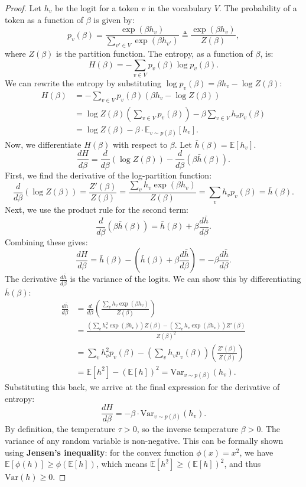 \begin{proof}
Let $h_v$ be the logit for a token $v$ in the vocabulary $V$. The probability of a token as a function of $\beta$ is given by:
\[
p_v(\beta) = \frac{\exp(\beta h_v)}{\sum_{v' \in V} \exp(\beta h_{v'})} \triangleq \frac{\exp(\beta h_v)}{Z(\beta)},
\]
where $Z(\beta)$ is the partition function. The entropy, as a function of $\beta$, is:
\[
H(\beta) = -\sum_{v \in V} p_v(\beta) \log p_v(\beta).
\]
We can rewrite the entropy by substituting $\log p_v(\beta) = \beta h_v - \log Z(\beta)$:
\begin{align*}
H(\beta) &= -\sum_{v \in V} p_v(\beta) (\beta h_v - \log Z(\beta)) \\
&= \log Z(\beta) \left(\sum_{v \in V} p_v(\beta)\right) - \beta \sum_{v \in V} h_v p_v(\beta) \\
&= \log Z(\beta) - \beta \cdot \mathbb{E}_{v \sim p(\beta)}[h_v].
\end{align*}
Now, we differentiate $H(\beta)$ with respect to $\beta$. Let $\bar{h}(\beta) = \mathbb{E}[h_v]$.
\[
\frac{dH}{d\beta} = \frac{d}{d\beta}(\log Z(\beta)) - \frac{d}{d\beta}(\beta \bar{h}(\beta)).
\]
First, we find the derivative of the log-partition function:
\[
\frac{d}{d\beta}(\log Z(\beta)) = \frac{Z'(\beta)}{Z(\beta)} = \frac{\sum_v h_v \exp(\beta h_v)}{Z(\beta)} = \sum_v h_v p_v(\beta) = \bar{h}(\beta).
\]
Next, we use the product rule for the second term:
\[
\frac{d}{d\beta}(\beta \bar{h}(\beta)) = \bar{h}(\beta) + \beta \frac{d\bar{h}}{d\beta}.
\]
Combining these gives:
\[
\frac{dH}{d\beta} = \bar{h}(\beta) - \left(\bar{h}(\beta) + \beta \frac{d\bar{h}}{d\beta}\right) = -\beta \frac{d\bar{h}}{d\beta}.
\]
The derivative $\frac{d\bar{h}}{d\beta}$ is the variance of the logits. We can show this by differentiating $\bar{h}(\beta)$:
\begin{align*}
\frac{d\bar{h}}{d\beta} &= \frac{d}{d\beta}\left( \frac{\sum_v h_v \exp(\beta h_v)}{Z(\beta)} \right) \\
&= \frac{(\sum_v h_v^2 \exp(\beta h_v))Z(\beta) - (\sum_v h_v \exp(\beta h_v))Z'(\beta)}{Z(\beta)^2} \\
&= \sum_v h_v^2 p_v(\beta) - \left(\sum_v h_v p_v(\beta)\right)\left(\frac{Z'(\beta)}{Z(\beta)}\right) \\
&= \mathbb{E}[h^2] - (\mathbb{E}[h])^2 = \mathrm{Var}_{v \sim p(\beta)}(h_v).
\end{align*}
Substituting this back, we arrive at the final expression for the derivative of entropy:
\[
\frac{dH}{d\beta} = -\beta \cdot \mathrm{Var}_{v \sim p(\beta)}(h_v).
\]
By definition, the temperature $\tau > 0$, so the inverse temperature $\beta > 0$. The variance of any random variable is non-negative. This can be formally shown using \textbf{Jensen's inequality}: for the convex function $\phi(x)=x^2$, we have $\mathbb{E}[\phi(h)] \ge \phi(\mathbb{E}[h])$, which means $\mathbb{E}[h^2] \ge (\mathbb{E}[h])^2$, and thus $\mathrm{Var}(h) \ge 0$.


\end{proof}
